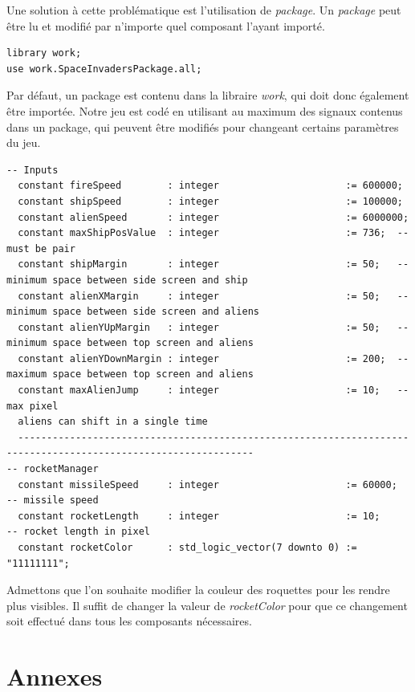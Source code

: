 \documentclass[french]{nakrule}
\begin{document}
Une solution à cette problématique est l'utilisation de \emph{package}. Un
\emph{package} peut être lu et modifié par n'importe quel composant l'ayant
importé.
\begin{lstlisting}[style=vhdl, caption=Importation d'un package]
library work;
use work.SpaceInvadersPackage.all;
\end{lstlisting}

Par défaut, un package est contenu dans la libraire \emph{work}, qui doit donc
également être importée. Notre jeu est codé en utilisant au maximum des signaux
contenus dans un package, qui peuvent être modifiés pour changeant certains
paramètres du jeu.

\begin{lstlisting}[style=vhdl, caption=Signaux utilisés par \emph{Input} \& \emph{rocketManager}]
-- Inputs
  constant fireSpeed        : integer                      := 600000;
  constant shipSpeed        : integer                      := 100000;
  constant alienSpeed       : integer                      := 6000000;
  constant maxShipPosValue  : integer                      := 736;  -- must be pair
  constant shipMargin       : integer                      := 50;   -- minimum space between side screen and ship
  constant alienXMargin     : integer                      := 50;   -- minimum space between side screen and aliens
  constant alienYUpMargin   : integer                      := 50;   -- minimum space between top screen and aliens
  constant alienYDownMargin : integer                      := 200;  -- maximum space between top screen and aliens
  constant maxAlienJump     : integer                      := 10;   -- max pixel
  aliens can shift in a single time
  ---------------------------------------------------------------------------------------------------------------
-- rocketManager
  constant missileSpeed     : integer                      := 60000;  -- missile speed
  constant rocketLength     : integer                      := 10;     -- rocket length in pixel
  constant rocketColor      : std_logic_vector(7 downto 0) := "11111111";
\end{lstlisting}

Admettons que l'on souhaite modifier la couleur des roquettes pour les rendre
plus visibles. Il suffit de changer la valeur de \emph{rocketColor} pour que ce
changement soit effectué dans tous les composants nécessaires. 

\asymmetricalPage
\chapter{Annexes}
\end{document}
